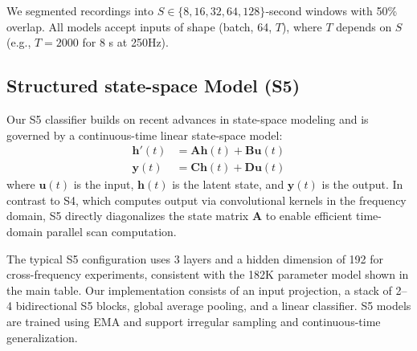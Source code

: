 \documentclass{article}
\begin{document}
We segmented recordings into $S\in\{8,16,32,64,128\}$‑second windows with 50\% overlap. All models accept inputs of shape (batch, 64, $T$), where $T$ depends on $S$ (e.g., $T=2000$ for 8 s at 250Hz).

\subsection{Structured state-space Model (S5)}
Our S5 classifier builds on recent advances in state-space modeling and is governed by a continuous-time linear state-space model:
\begin{align}
\mathbf{h}'(t) &= \mathbf{A} \mathbf{h}(t) + \mathbf{B} \mathbf{u}(t) \\
\mathbf{y}(t) &= \mathbf{C} \mathbf{h}(t) + \mathbf{D} \mathbf{u}(t)
\end{align}
where $\mathbf{u}(t)$ is the input, $\mathbf{h}(t)$ is the latent state, and $\mathbf{y}(t)$ is the output. In contrast to S4, which computes output via convolutional kernels in the frequency domain, S5 directly diagonalizes the state matrix $\mathbf{A}$ to enable efficient time-domain parallel scan computation.

The typical S5 configuration uses 3 layers and a hidden dimension of 192 for cross-frequency experiments, consistent with the 182K parameter model shown in the main table.
Our implementation consists of an input projection, a stack of 2--4 bidirectional S5 blocks, global average pooling, and a linear classifier. S5 models are trained using EMA and support irregular sampling and continuous-time generalization.

\end{document}
